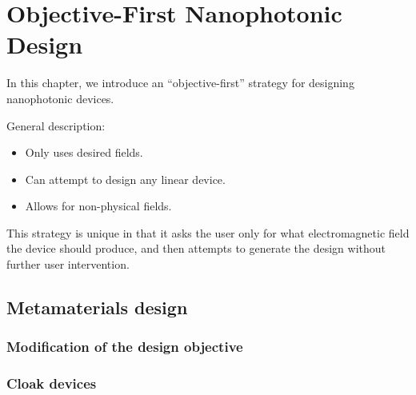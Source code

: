 \newcommand{\BE}{\begin{equation}}
\newcommand{\EE}{\end{equation}}
\newcommand{\BA}{\begin{eqnarray}}
\newcommand{\EA}{\end{eqnarray}}
\newcommand{\curl}{\nabla\times}
\newcommand{\minimize}[1]{\JLUminimize_{#1}\;&}
\newcommand{\subto}{\text{subject to}\;&}

\newcommand{\myfig}[2]{\begin{figure}[!h]\texttt{[image: fig/\#1]}\caption{#2}\label{#1}\end{figure}}
\newcommand{\BI}{\begin{itemize}\item}
\renewcommand{\I}{\item}
\newcommand{\EI}{\end{itemize}}
\newcommand{\ER}[1]{\eqref{eq:#1}}
\chapter{Objective-First Nanophotonic Design}
\label{intro}


In this chapter, we introduce an ``objective-first'' strategy 
    for designing nanophotonic devices.

General description:
\BI Only uses desired fields.
\I  Can attempt to design any linear device.
\I  Allows for non-physical fields. \EI

This strategy is unique in that it
    asks the user only for what electromagnetic field
    the device should produce,
    and then attempts to generate the design
    without further user intervention.







\section{Metamaterials design}
\subsection{Modification of the design objective}
\subsection{Cloak devices}
